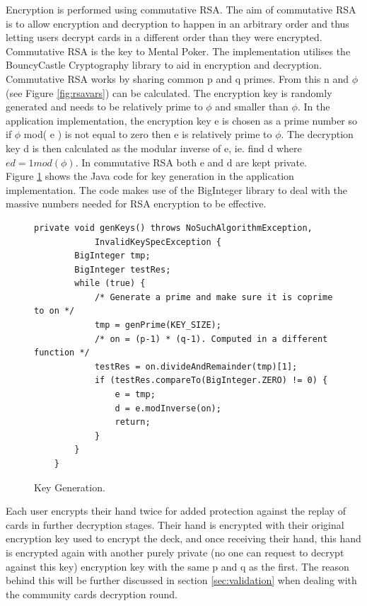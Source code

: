 \documentclass[11pt, oneside]{article}   	%
\begin{document}
Encryption is performed using commutative RSA. The aim of commutative RSA is to allow encryption and decryption to happen in an arbitrary order and thus letting users decrypt cards in a different order than they were encrypted. Commutative RSA is the key to Mental Poker. The implementation utilises the BouncyCastle Cryptography library to aid in encryption and decryption.\\

Commutative RSA works by sharing common p and q primes. From this n and $\phi$ (see Figure \ref{fig:rsavars}) can be calculated. The encryption key is randomly generated and needs to be relatively prime to $\phi$ and smaller than $\phi$. In the application implementation, the encryption key e is chosen as a prime number so if $\phi$ mod( e ) is not equal to zero then e is relatively prime to $\phi$.  The decryption key d is then calculated as the modular inverse of e, ie. find d where $ed = 1 mod ( \phi)$. In commutative RSA both e and d are kept private.\\

Figure \ref{fig:code} shows the Java code for key generation in the application implementation. The code makes use of the BigInteger library to deal with the massive numbers needed for RSA encryption to be effective. 

\begin{figure}[H]
\caption{Key Generation.}
\begin{framed}
\begin{lstlisting}
private void genKeys() throws NoSuchAlgorithmException,
			InvalidKeySpecException {
		BigInteger tmp;
		BigInteger testRes;
		while (true) {
 			/* Generate a prime and make sure it is coprime to on */
			tmp = genPrime(KEY_SIZE);
			/* on = (p-1) * (q-1). Computed in a different function */
			testRes = on.divideAndRemainder(tmp)[1];
			if (testRes.compareTo(BigInteger.ZERO) != 0) {
				e = tmp;
				d = e.modInverse(on);
				return;
			}
		}
	}
\end{lstlisting}
\vspace{-0.45cm} 
\end{framed}
\vspace{-0.45cm} 
\label{fig:code}
\end{figure}

Each user encrypts their hand twice for added protection against the replay of cards in further decryption stages. Their hand is encrypted with their original encryption key used to encrypt the deck, and once receiving their hand, this hand is encrypted again with another purely private (no one can request to decrypt against this key) encryption key with the same p and q as the first. The reason behind this will be further discussed in section \ref{sec:validation} when dealing with the community cards decryption round.
\end{document}

